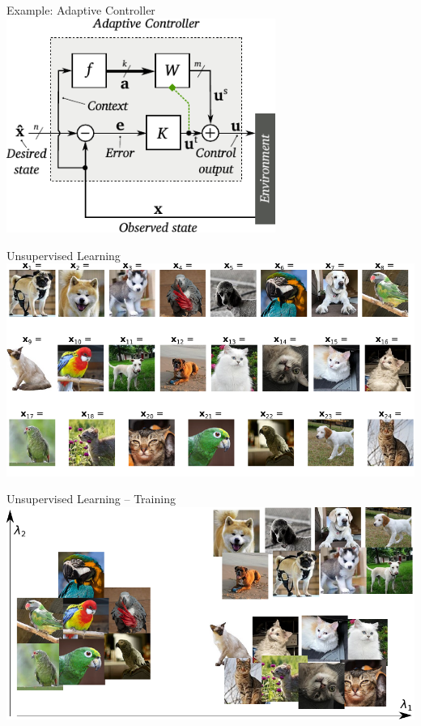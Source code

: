 \documentclass[handout,aspectratio=169]{beamer}
\begin{document}
	\begin{frame}{Example: Adaptive Controller}
		\centering
		\includegraphics[height=7cm]{media/adaptive_controller.pdf}
	\end{frame}

	\begin{frame}{Unsupervised Learning}
		\centering
		\includegraphics[scale=0.95]{media/learning_example_unsupervised.pdf}
	\end{frame}
	
	\begin{frame}{Unsupervised Learning -- Training}
		\centering
		\includegraphics[scale=0.95]{media/learning_example_unsupervised_2.pdf}
	\end{frame}
	
\end{document}
